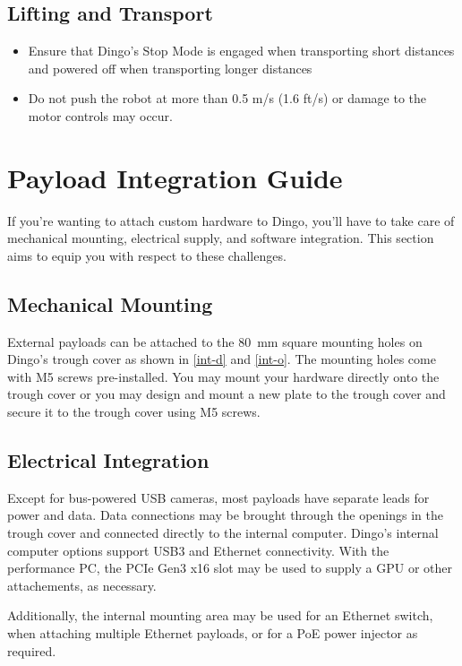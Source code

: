 \documentclass[]{clearpath-latex/clearpath-manual}
\begin{document}
\subsection{Lifting and Transport}

\begin{itemize}[nolistsep]
	\item Ensure that Dingo's Stop Mode is engaged when transporting short distances and powered off when transporting longer distances
	\item Do not push the robot at more than 0.5 m/s (1.6 ft/s) or damage to the motor controls may occur.
\end{itemize}


\section{Payload Integration Guide}

If you're wanting to attach custom hardware to Dingo, you'll have to take care of
mechanical mounting, electrical supply, and software integration. This section
aims to equip you with respect to these challenges.

\subsection{Mechanical Mounting}

External payloads can be attached to the \SI{80}{\mm} square mounting holes on Dingo's
trough cover as shown in \autoref{int-d} and \autoref{int-o}.
The mounting holes come with M5 screws pre-installed. You may mount your hardware directly
onto the trough cover or you may design and mount a new plate to the trough cover and
secure it to the trough cover using M5 screws.

\subsection{Electrical Integration}\label{payload-elec}

Except for bus-powered USB cameras, most payloads have separate leads for power and data. Data
connections may be brought through the openings in the trough cover and connected directly to
the internal computer.
Dingo's internal computer options support USB3 and Ethernet connectivity. With the performance
PC, the PCIe Gen3 x16 slot may be used to supply a GPU or other attachements, as necessary.

Additionally, the internal mounting area may be used for an Ethernet switch, when attaching multiple
Ethernet payloads, or for a PoE power injector as required.
\end{document}
